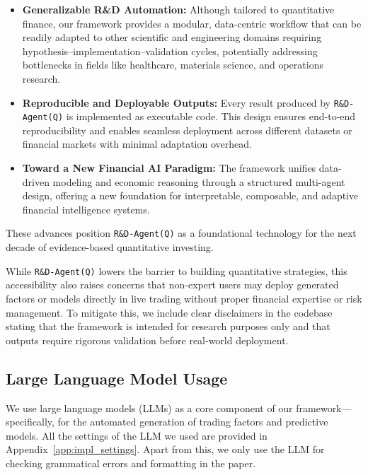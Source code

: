 \documentclass{article}
\newcommand{\name}{\texttt{R\&D-Agent(Q)}}
\begin{document}
\begin{itemize}[leftmargin=4ex]
    \item \textbf{Generalizable R\&D Automation:} Although tailored to quantitative finance, our framework provides a modular, data-centric workflow that can be readily adapted to other scientific and engineering domains requiring hypothesis–implementation–validation cycles, potentially addressing bottlenecks in fields like healthcare, materials science, and operations research.
    
     \item \textbf{Reproducible and Deployable Outputs:} Every result produced by \texttt{\name} is implemented as executable code. This design ensures end-to-end reproducibility and enables seamless deployment across different datasets or financial markets with minimal adaptation overhead.
    
    \item \textbf{Toward a New Financial AI Paradigm:} The framework unifies data-driven modeling and economic reasoning through a structured multi-agent design, offering a new foundation for interpretable, composable, and adaptive financial intelligence systems.
\end{itemize}

\noindent These advances position \texttt{\name} as a foundational technology for the next decade of evidence-based quantitative investing.

While \texttt{\name} lowers the barrier to building quantitative strategies, this accessibility also raises concerns that non-expert users may deploy generated factors or models directly in live trading without proper financial expertise or risk management. To mitigate this, we include clear disclaimers in the codebase stating that the framework is intended for research purposes only and that outputs require rigorous validation before real-world deployment.



\subsection{Large Language Model Usage}
\label{app:llm}
We use large language models (LLMs) as a core component of our framework—specifically, for the automated generation of trading factors and predictive models. All the settings of the LLM we used are provided in Appendix~\ref{app:impl_settings}. Apart from this, we only use the LLM for checking grammatical errors and formatting in the paper.
\end{document}
